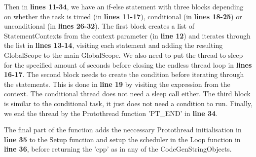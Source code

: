 Then in \textbf{lines 11-34}, we have an if-else statement with three blocks depending on whether the task is timed (in \textbf{lines 11-17}), conditional (in \textbf{lines 18-25}) or unconditional (in \textbf{lines 26-32}). The first block creates a list of StatementContexts from the context parameter (in \textbf{line 12}) and iterates through the list in \textbf{lines 13-14}, visiting each statement and adding the resulting GlobalScope to the main GlobalScope. We also need to put the thread to sleep for the specified amount of seconds before closing the endless thread loop in \textbf{lines 16-17}. The second block needs to create the condition before iterating through the statements. This is done in \textbf{line 19} by visiting the expression from the context. The conditional thread does not need a sleep call either. The third block is similar to the conditional task, it just does not need a condition to run. Finally, we end the thread by the Protothread function 'PT\_END' in \textbf{line 34}.

The final part of the function adds the neccessary Protothread initialisation in \textbf{line 35} to the Setup function and setup the scheduler in the Loop function in \textbf{line 36}, before returning the 'cpp' as in any of the CodeGenStringObjects.

